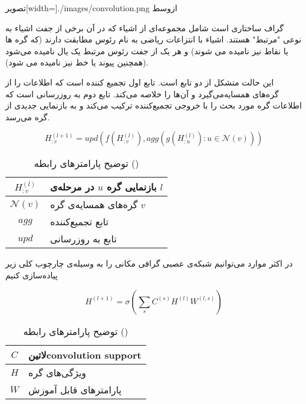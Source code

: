   ‌تصویر[width=\textwidth]{./images/convolution.png}
  ‌ازوسط

گراف ساختاری است شامل مجموعه‌ای از اشیاء که در آن برخی از جفت اشیاء به نوعی "مرتبط" هستند. اشیاء با انتزاعات ریاضی به نام رئوس مطابقت دارند (که گره ها یا نقاط نیز نامیده می شوند) و هر یک از جفت رئوس مرتبط یک یال نامیده می‌شود (همچنین پیوند یا خط نیز نامیده می شود).



این حالت متشکل از دو تابع است. تابع اول تجمیع کننده است که اطلاعات را از گره‌های همسایه‌می‌گیرد و آن‌ها را خلاصه می‌کند. تابع دوم به روزرسانی است که اطلاعات گره مورد بحث را با خروجی تجمیع‌کننده ترکیب می‌کند و به بازنمایی جدیدی از گره می‌رسد.

\begin{equation}
  \label{eq:spatial}
H_{:v}^{(l+1)}=upd(f(H_{:v}^{(l)}),agg(g(H_{:u}^{(l)}): u\in \mathcal{N}(v)))
\end{equation}

\begin{table}[h]
  \centering
  \caption{توضیح پارامترهای رابطه ()}
  \begin{tabular}{|c|p{}|}
    \hline
    $H_{:v}^{(l)}$ & بازنمایی گره $u$ در مرحله‌ی $l$ \\
    \hline
    $\mathcal{N}(v)$ & گره‌های همسایه‌ی گره $v$ \\
    \hline
    $agg$ & تابع تجمیع‌کننده \\
    \hline
    $upd$ & تابع به روزرسانی \\
    \hline
  \end{tabular}
  \label{tbl:distance}
\end{table}

در اکثر موارد می‌توانیم شبکه‌ی عصبی گرافی مکانی را به وسیله‌ی چارچوب کلی زیر پیاده‌سازی کنیم

\begin{equation}
  \label{eq:spatial_1}
H^{(l+1)}=\sigma(\sum_{s}C^{(s)}H^{(l)}W^{(l,s)})
\end{equation}

\begin{table}[h]
  \centering
  \caption{توضیح پارامترهای رابطه ()}
  \begin{tabular}{|c|p{}|}
    \hline
    $C$ & ‌لاتین{convolution support} \\
    \hline
    $H$ & ویژگی‌های گره \\
    \hline
    $W$ & پارامترهای قابل آموزش \\
    \hline
  \end{tabular}
  \label{tbl:distance}
\end{table}

